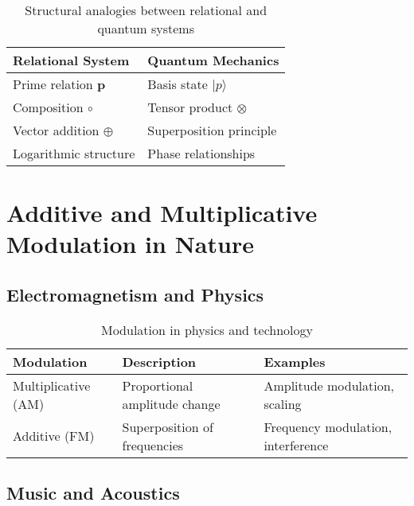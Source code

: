 \documentclass[11pt,a4paper]{article}
\newcommand{\primrel}[1]{\mathbf{#1}}
\begin{document}
	\begin{table}[htbp]
		\centering
		\begin{adjustbox}{width=0.85\textwidth}
			\begin{tabular}{ll}
				\toprule
				\textbf{Relational System} & \textbf{Quantum Mechanics} \\
				\midrule
				Prime relation $\primrel{p}$ & Basis state $|p\rangle$ \\
				Composition $\circ$ & Tensor product $\otimes$ \\
				Vector addition $\oplus$ & Superposition principle \\
				Logarithmic structure & Phase relationships \\
				\bottomrule
			\end{tabular}
		\end{adjustbox}
		\caption{Structural analogies between relational and quantum systems}
		\label{tab:quantenanalogien}
	\end{table}
	
	\section{Additive and Multiplicative Modulation in Nature}
	
	\subsection{Electromagnetism and Physics}
	
	\begin{table}[htbp]
		\centering
		\begin{adjustbox}{width=0.9\textwidth}
			\begin{tabular}{lll}
				\toprule
				\textbf{Modulation} & \textbf{Description} & \textbf{Examples} \\
				\midrule
				Multiplicative (AM) & Proportional amplitude change & Amplitude modulation, scaling \\
				Additive (FM) & Superposition of frequencies & Frequency modulation, interference \\
				\bottomrule
			\end{tabular}
		\end{adjustbox}
		\caption{Modulation in physics and technology}
		\label{tab:modulation}
	\end{table}
	
	\subsection{Music and Acoustics}
	
\end{document}
